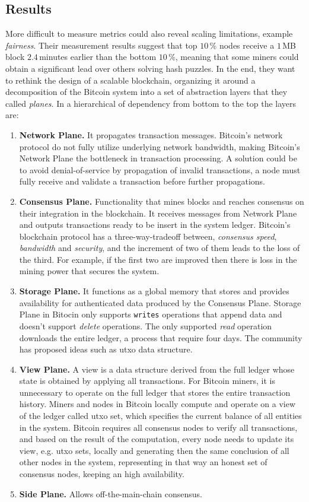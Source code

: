 \documentclass[USenglish]{uit-thesis}
\begin{document}
\subsection{Results}
More difficult to measure metrics could also reveal scaling
limitations, example \emph{fairness}. Their measurement results
suggest that top $10$\,\% nodes receive a $1$\,MB block $2.4$\,minutes
earlier than the bottom $10$\,\%, meaning that some miners could
obtain a significant lead over others solving hash puzzles. In the end,
they want to rethink the design of a scalable blockchain, organizing
it around a decomposition of the Bitcoin system into a set of abstraction
layers that they called \emph{planes}. In a hierarchical of
dependency from bottom to the top the layers are:
\begin{enumerate}[noitemsep]
	\item \textbf{Network Plane.} It propagates transaction messages. Bitcoin's
	network protocol do not fully utilize underlying network bandwidth,
	making Bitcoin's Network Plane the bottleneck in transaction processing.
	A solution could be to avoid denial-of-service by propagation
	of invalid transactions, a node must fully receive and validate a transaction
	before further propagations.
	\item \textbf{Consensus Plane.} Functionality that mines
	blocks and reaches consensus on their integration
	in the blockchain. It receives
	messages from Network Plane and outputs transactions ready to be insert
	in the system ledger. Bitcoin's blockchain protocol has a three-way-tradeoff
	between, \emph{consensus speed}, \emph{bandwidth} and \emph{security}, and
	the increment of two of them leads to the loss of the third. For example,
	if the first two are improved then there is loss in the mining power
	that secures the system.
	\item \textbf{Storage Plane.} It functions as a global memory
	that stores and provides availability for authenticated data produced
	by the Consensus Plane. Storage Plane in Bitocin only supports
	\texttt{writes} operations that append data and doesn't support
	\emph{delete} operations. The only supported \emph{read} operation
	downloads the entire ledger, a process that require four days. The
	community has proposed ideas such as \gls{utxo} data structure.
	\item \textbf{View Plane.} A view is a data structure derived from the
	full ledger whose state is obtained by applying all transactions. For
	Bitcoin miners, it is unnecessary to operate on the full ledger that
	stores the entire transaction history. Miners and nodes in Bitcoin
	locally compute and operate on a view of the ledger called \gls{utxo} set,
	which specifies the current balance of all entities in the system.
	Bitcoin requires all consensus nodes to verify all transactions, and
	based on the result of the computation, every node needs to update its
	view, e.g. \gls{utxo} sets, locally and generating then the same conclusion
	of all other nodes in the system, representing in that way
	an honest set of consensus nodes, keeping an high availability.
	\item \textbf{Side Plane.} Allows off-the-main-chain consensus.
\end{enumerate}
\end{document}
